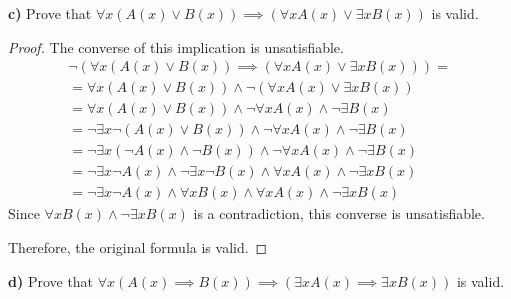\documentclass[titlepage, letterpaper, fleqn]{article}
\newcommand{\spacepls}{\vspace{5mm}}
\begin{document}
\spacepls

{\large \textbf{c)} Prove that \(\forall x (A(x) \vee B(x)) \implies (\forall x A(x) \vee \exists x B(x))\) is valid.}

\spacepls

\begin{proof}
The converse of this implication is unsatisfiable.
\begin{align*}
& \neg (\forall x (A(x) \vee B(x)) \implies (\forall x A(x) \vee \exists x B(x))) = & \tag*{Converse}
\\ & = \forall x (A (x) \vee B(x)) \wedge \neg (\forall x A(x) \vee \exists x B(x)) & \tag*{Material implication \& de Morgan}
\\ & = \forall x (A (x) \vee B(x)) \wedge \neg \forall x A(x) \wedge \neg \exists B(x) & \tag*{de Morgan}
\\ & = \neg \exists x \neg (A(x) \vee B(x)) \wedge \neg \forall x A(x) \wedge \neg \exists B(x) & \tag*{Duality of quantifiers}
\\ & = \neg \exists x (\neg A(x) \wedge \neg B(x)) \wedge \neg \forall x A(x) \wedge \neg \exists B(x) & \tag*{de Morgan}
\\ & = \neg \exists x \neg A(x) \wedge \neg \exists x \neg B(x) \wedge \forall x A(x) \wedge \neg \exists x B(x) & \tag*{$\exists$ distributes over $\wedge$}
\\ & = \neg \exists x \neg A(x) \wedge \forall x B(x) \wedge \forall x A(x) \wedge \neg \exists x B(x) & \tag*{Duality of quantifiers}
\end{align*}
Since \(\forall x B(x) \wedge \neg \exists x B(x)\) is a contradiction, this converse is unsatisfiable.

Therefore, the original formula is valid.
\end{proof}

\spacepls

{\large \textbf{d)} Prove that \(\forall x (A(x) \implies B(x)) \implies (\exists x A(x) \implies \exists x B(x))\) is valid.}

\spacepls
\end{document}

